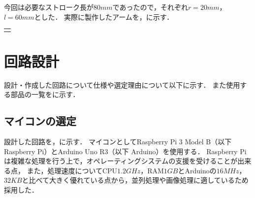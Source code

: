 \documentclass[11pt,a4]{jsarticle}
\begin{document}
    今回は必要なストローク長が$80\unit{mm}$であったので，それぞれ$r=20\unit{mm}$，$l=60\unit{mm}$とした．
    実際に製作したアームを，に示す．


    \begin{tabular}{c}
      \begin{minipage}{0.45\hsize}
        {H}{1.0}{picture/arm_left.eps}{アーム左面}
      \end{minipage}
      \begin{minipage}{0.45\hsize}
        {H}{1.0}{picture/arm_right.eps}{アーム左面}
      \end{minipage}
    \end{tabular}


\section{回路設計}  %

  設計・作成した回路について仕様や選定理由について以下に示す．
  また使用する部品の一覧をに示す．

  \subsection{マイコンの選定}
    設計した回路を，に示す．
    マイコンとしてRaspberry Pi 3 Model B（以下 Raspberry Pi）とArduino Uno R3（以下 Arduino）を使用する．
    Raspberry Piは複雑な処理を行う上で，オペレーティングシステムの支援を受けることが出来る点，
    また，処理速度についてCPU$1.2\unit{GHz}$，RAM$1\unit{GB}$とArduinoの$16\unit{MHz}$，$32\unit{KB}$と比べて大きく優れている点から，並列処理や画像処理に適しているため採用した．
\end{document}
